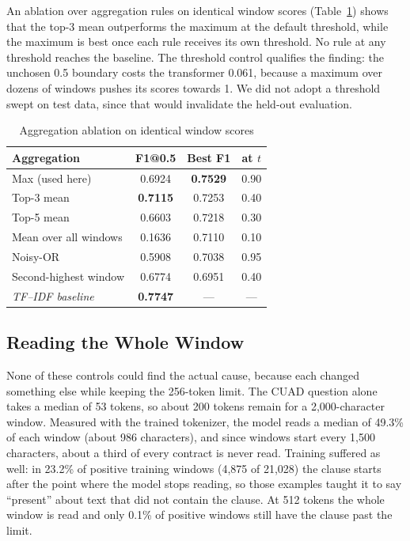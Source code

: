 \documentclass[journal]{IEEEtran}
\begin{document}
An ablation over aggregation rules on identical window scores (Table~\ref{tab:pool}) shows that the
top-3 mean outperforms the maximum at the default threshold, while the maximum is best once each
rule receives its own threshold. No rule at any threshold reaches the baseline. The threshold
control qualifies the finding: the unchosen 0.5 boundary costs the transformer 0.061, because a
maximum over dozens of windows pushes its scores towards 1. We did not adopt a threshold swept on
test data, since that would invalidate the held-out evaluation.

\begin{table}[!t]
\caption{Aggregation ablation on identical window scores}
\label{tab:pool}
\centering
\small
\setlength{\tabcolsep}{4pt}
\begin{tabular}{lccc}
\toprule
\textbf{Aggregation} & \textbf{F1@0.5} & \textbf{Best F1} & \textbf{at $t$}\\
\midrule
Max (used here)       & 0.6924 & \textbf{0.7529} & 0.90\\
Top-3 mean            & \textbf{0.7115} & 0.7253 & 0.40\\
Top-5 mean            & 0.6603 & 0.7218 & 0.30\\
Mean over all windows & 0.1636 & 0.7110 & 0.10\\
Noisy-OR              & 0.5908 & 0.7038 & 0.95\\
Second-highest window & 0.6774 & 0.6951 & 0.40\\
\midrule
\emph{TF--IDF baseline} & \textbf{0.7747} & --- & ---\\
\bottomrule
\end{tabular}
\end{table}

\subsection{Reading the Whole Window}
\label{sec:v2}
None of these controls could find the actual cause, because each changed something else while
keeping the 256-token limit. The CUAD question alone takes a median of 53 tokens, so about 200
tokens remain for a 2,000-character window. Measured with the trained tokenizer, the model reads a
median of 49.3\% of each window (about 986 characters), and since windows start every 1,500
characters, about a third of every contract is never read. Training suffered as well: in 23.2\% of
positive training windows (4,875 of 21,028) the clause starts after the point where the model stops
reading, so those examples taught it to say ``present'' about text that did not contain the clause.
At 512 tokens the whole window is read and only 0.1\% of positive windows still have the clause past
the limit.
\end{document}
